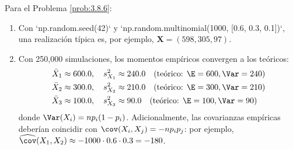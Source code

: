 \begin{solucion}
	\label{sol:3.8.6}
	Para el Problema \ref{prob:3.8.6}:
	\begin{enumerate}
		\item Con `np.random.seed(42)` y `np.random.multinomial(1000, [0.6, 0.3, 0.1])`, una realización típica es, por ejemplo, $\bm{X} = (598, 305, 97)$.
		\item Con 250{,}000 simulaciones, los momentos empíricos convergen a los teóricos:
		\begin{align*}
			\bar{X}_{1} &\approx 600.0, \quad s_{X_{1}}^{2} \approx 240.0 \quad (\text{teórico: } \E = 600, \Var = 240) \\
			\bar{X}_{2} &\approx 300.0, \quad s_{X_{2}}^{2} \approx 210.0 \quad (\text{teórico: } \E = 300, \Var = 210) \\
			\bar{X}_{3} &\approx 100.0, \quad s_{X_{3}}^{2} \approx 90.0 \quad (\text{teórico: } \E = 100, \Var = 90)
		\end{align*}
		donde $\Var(X_{i}) = np_{i}(1-p_{i})$. Adicionalmente, las covarianzas empíricas deberían coincidir con $\cov(X_{i}, X_{j}) = -np_{i}p_{j}$: por ejemplo, $\widehat{\cov}(X_{1}, X_{2}) \approx -1000 \cdot 0.6 \cdot 0.3 = -180$.
	\end{enumerate}
\end{solucion}

